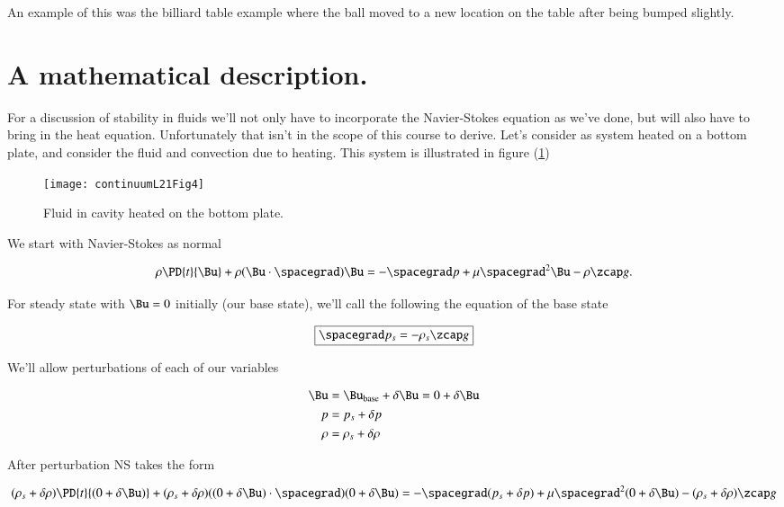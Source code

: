 An example of this was the billiard table example where the ball moved to a new location on the table after being bumped slightly.

\section{A mathematical description.}

For a discussion of stability in fluids we'll not only have to incorporate the Navier-Stokes equation as we've done, but will also have to bring in the heat equation.  Unfortunately that isn't in the scope of this course to derive.  Let's consider as system heated on a bottom plate, and consider the fluid and convection due to heating.  This system is illustrated in figure (\ref{fig:continuumL21:continuumL21Fig4})

\begin{figure}[htp]
   \centering
   \texttt{[image: continuumL21Fig4]}
   \caption{Fluid in cavity heated on the bottom plate.}\label{fig:continuumL21:continuumL21Fig4}
\end{figure}

We start with Navier-Stokes as normal

\begin{equation}\label{eqn:continuumL21:50}
\rho \PD{t}{\Bu} + \rho (\Bu \cdot \spacegrad) \Bu = - \spacegrad p + \mu \spacegrad^2 \Bu - \rho \zcap g.
\end{equation}

For steady state with $\Bu = 0$ initially (our base state), we'll call the following the equation of the base state

\begin{equation}\label{eqn:continuumL21:70}
\boxed{
\spacegrad p_s = -\rho_s \zcap g
}
\end{equation}

We'll allow perturbations of each of our variables

\begin{align*}
\Bu &= \Bu_\text{base} + \delta \Bu = 0 + \delta \Bu \\
p &= p_s + \delta p \\
\rho &= \rho_s + \delta \rho
\end{align*}

After perturbation NS takes the form

\begin{equation}\label{eqn:continuumL21:90}
(\rho_s + \delta \rho )\PD{t}{(0 + \delta \Bu)} + (\rho_s + \delta \rho) ((0 + \delta \Bu) \cdot \spacegrad) (0 + \delta \Bu) = - \spacegrad (p_s + \delta p) + \mu \spacegrad^2 (0 + \delta \Bu) - (\rho_s + \delta \rho) \zcap g
\end{equation}

